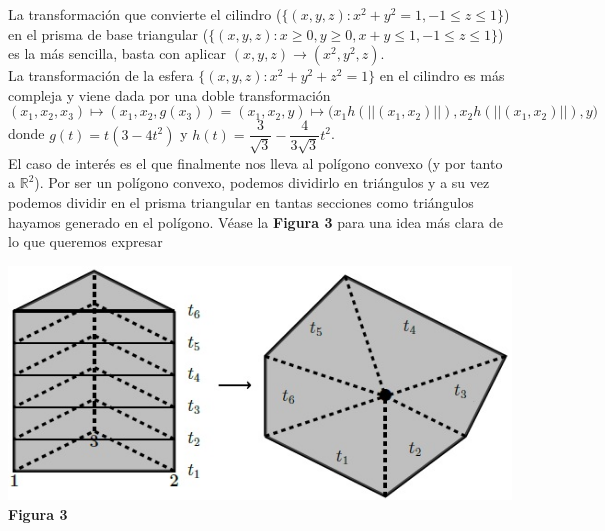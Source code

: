 \documentclass[11pt]{article}
\theoremstyle{definition} %
\newcommand{\R}{\mathbb{R}}
\newcommand{\norm}[1]{\left|\left|#1\right|\right|}
\begin{document}
La transformación que convierte el cilindro ($\{(x,y,z): x^2+y^2=1, -1\leq z\leq1\}$) en el prisma de base triangular ($\{(x,y,z): x\geq0,y\geq0, x+y\leq1, -1\leq z\leq1\}$) es la más sencilla, basta con aplicar $(x,y,z)\to(x^2,y^2,z)$.\\

La transformación de la esfera $\{(x,y,z):x^2+y^2+z^2 = 1\}$ en el cilindro es más compleja y viene dada por una doble transformación
\[(x_1,x_2,x_3)\mapsto(x_1,x_2,g(x_3))=(x_1,x_2,y)\mapsto	\big(x_1h(\norm{(x_1,x_2)}),x_2h(\norm{(x_1,x_2)}), y\big)\]
donde $g(t)=t(3-4t^2)$ y $h(t)=\dfrac{3}{\sqrt{3}}-\dfrac{4}{3\sqrt{3}}t^2$.\\

El caso de interés es el que finalmente nos lleva al polígono convexo (y por tanto a $\R^2$). Por ser un polígono convexo, podemos dividirlo en triángulos y a su vez podemos dividir en el prisma triangular en tantas secciones como triángulos hayamos generado en el polígono. Véase la \textbf{Figura 3} para una idea más clara de lo que queremos expresar

\begin{center}
\includegraphics[scale=0.4]{3}\\\textbf{Figura 3}
\end{center}
\end{document}
